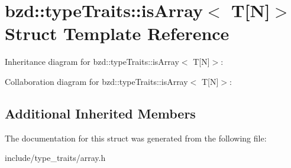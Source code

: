 \hypertarget{structbzd_1_1typeTraits_1_1isArray_3_01T[N]_4}{}\section{bzd\+:\+:type\+Traits\+:\+:is\+Array$<$ T\mbox{[}N\mbox{]}$>$ Struct Template Reference}
\label{structbzd_1_1typeTraits_1_1isArray_3_01T[N]_4}


Inheritance diagram for bzd\+:\+:type\+Traits\+:\+:is\+Array$<$ T\mbox{[}N\mbox{]}$>$\+:


Collaboration diagram for bzd\+:\+:type\+Traits\+:\+:is\+Array$<$ T\mbox{[}N\mbox{]}$>$\+:
\subsection*{Additional Inherited Members}


The documentation for this struct was generated from the following file\+:\begin{DoxyCompactItemize}
\item 
include/type\+\_\+traits/array.\+h\end{DoxyCompactItemize}
